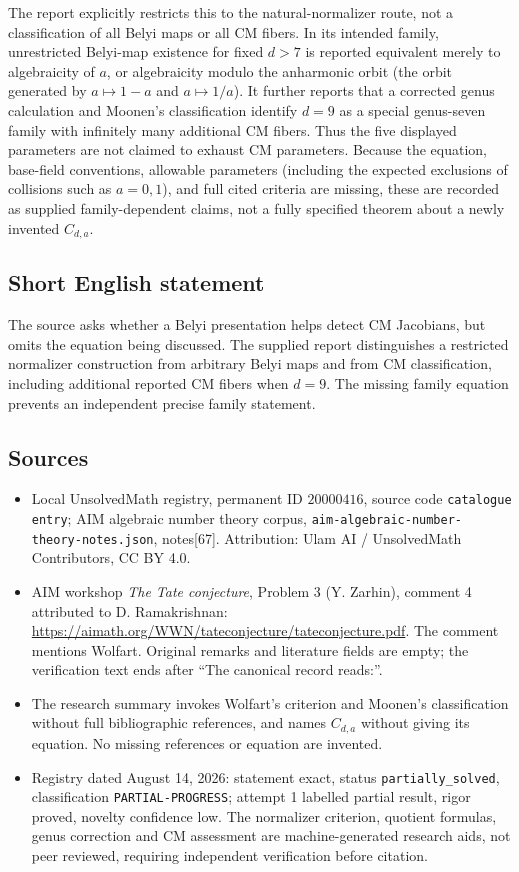 \documentclass[11pt]{article}
\begin{document}
The report explicitly restricts this to the natural-normalizer route, not a classification of all Belyi maps or all CM fibers. In its intended family, unrestricted Belyi-map existence for fixed \(d>7\) is reported equivalent merely to algebraicity of \(a\), or algebraicity modulo the anharmonic orbit (the orbit generated by \(a\mapsto1-a\) and \(a\mapsto1/a\)). It further reports that a corrected genus calculation and Moonen's classification identify \(d=9\) as a special genus-seven family with infinitely many additional CM fibers. Thus the five displayed parameters are not claimed to exhaust CM parameters. Because the equation, base-field conventions, allowable parameters (including the expected exclusions of collisions such as \(a=0,1\)), and full cited criteria are missing, these are recorded as supplied family-dependent claims, not a fully specified theorem about a newly invented \(C_{d,a}\).
\subsection{Short English statement}
The source asks whether a Belyi presentation helps detect CM Jacobians, but omits the equation being discussed. The supplied report distinguishes a restricted normalizer construction from arbitrary Belyi maps and from CM classification, including additional reported CM fibers when \(d=9\). The missing family equation prevents an independent precise family statement.
\subsection{Sources}
\begin{itemize}
\item Local UnsolvedMath registry, permanent ID \(20000416\), source code \texttt{catalogue entry}; AIM algebraic number theory corpus, \texttt{aim-algebraic-number-theory-notes.json}, notes[67]. Attribution: Ulam AI / UnsolvedMath Contributors, CC BY 4.0.
\item AIM workshop \emph{The Tate conjecture}, Problem 3 (Y. Zarhin), comment 4 attributed to D. Ramakrishnan: \url{https://aimath.org/WWN/tateconjecture/tateconjecture.pdf}. The comment mentions Wolfart. Original remarks and literature fields are empty; the verification text ends after ``The canonical record reads:''.
\item The research summary invokes Wolfart's criterion and Moonen's classification without full bibliographic references, and names \(C_{d,a}\) without giving its equation. No missing references or equation are invented.
\item Registry dated August 14, 2026: statement exact, status \texttt{partially\_solved}, classification \texttt{PARTIAL-PROGRESS}; attempt 1 labelled partial result, rigor proved, novelty confidence low. The normalizer criterion, quotient formulas, genus correction and CM assessment are machine-generated research aids, not peer reviewed, requiring independent verification before citation.
\end{itemize}
\end{document}
